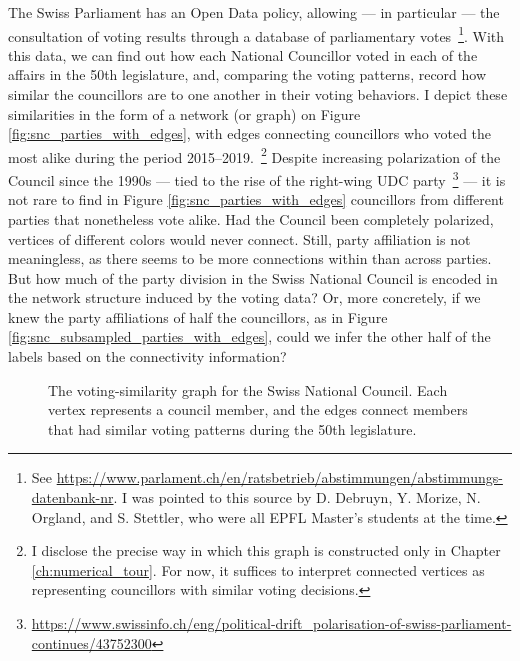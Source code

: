 The Swiss Parliament has an Open Data policy, allowing --- in particular --- the consultation of voting results through a database of parliamentary votes~\footnote{See \url{https://www.parlament.ch/en/ratsbetrieb/abstimmungen/abstimmungs-datenbank-nr}. I was pointed to this source by  D. Debruyn, Y. Morize, N. Orgland, and S. Stettler, who were all EPFL Master's students at the time.}. With this data, we can find out how each National Councillor voted in each of the affairs in the 50th legislature, and, comparing the voting patterns, record how similar the councillors are to one another in their voting behaviors. I depict these similarities in the form of a network (or graph) on Figure \ref{fig:snc_parties_with_edges}, with edges connecting councillors who voted the most alike during the period 2015--2019.~\footnote{I disclose the precise way in which this graph is constructed only in Chapter \ref{ch:numerical_tour}. For now, it suffices to interpret connected vertices as representing councillors with similar voting decisions.} Despite increasing polarization of the Council since the 1990s --- tied to the rise of the right-wing UDC party~\footnote{\url{https://www.swissinfo.ch/eng/political-drift_polarisation-of-swiss-parliament-continues/43752300}} --- it is not rare to find in Figure \ref{fig:snc_parties_with_edges} councillors from different parties that nonetheless vote alike. Had the Council been completely polarized, vertices of different colors would never connect. Still, party affiliation is not meaningless, as there seems to be more connections within than across parties. But how much of the party division in the Swiss National Council is encoded in the network structure induced by the voting data? Or, more concretely, if we knew the party affiliations of half the councillors, as in Figure \ref{fig:snc_subsampled_parties_with_edges}, could we infer the other half of the labels based on the connectivity information?

\begin{figure}[H]
    \centering
    \hfill
    \hfill
    \hfill
    \caption[The voting-similarity graph for the Swiss National Council]{The voting-similarity graph for the Swiss National Council. Each vertex represents a council member, and the edges connect members that had similar voting patterns during the 50th legislature.}
\end{figure}

